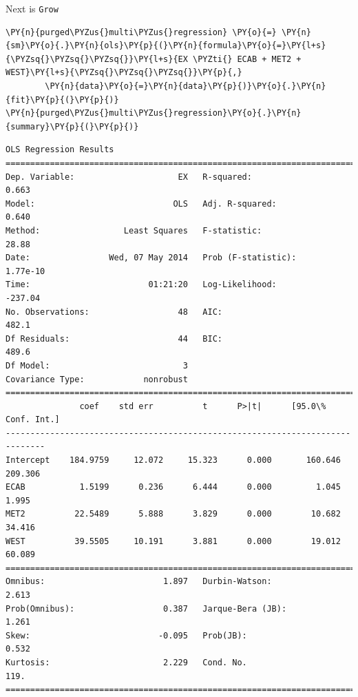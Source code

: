 \documentclass[10pt]{article}\usepackage[]{graphicx}\usepackage[]{xcolor}
\begin{document}
    Next is \texttt{Grow}

    \begin{Verbatim}[commandchars=\\\{\}]
\PY{n}{purged\PYZus{}multi\PYZus{}regression} \PY{o}{=} \PY{n}{sm}\PY{o}{.}\PY{n}{ols}\PY{p}{(}\PY{n}{formula}\PY{o}{=}\PY{l+s}{\PYZsq{}\PYZsq{}\PYZsq{}}\PY{l+s}{EX \PYZti{} ECAB + MET2 + WEST}\PY{l+s}{\PYZsq{}\PYZsq{}\PYZsq{}}\PY{p}{,}
        \PY{n}{data}\PY{o}{=}\PY{n}{data}\PY{p}{)}\PY{o}{.}\PY{n}{fit}\PY{p}{(}\PY{p}{)}
\PY{n}{purged\PYZus{}multi\PYZus{}regression}\PY{o}{.}\PY{n}{summary}\PY{p}{(}\PY{p}{)}
\end{Verbatim}

\begin{Verbatim}[commandchars=\\\{\}]
                          OLS Regression Results                            
==============================================================================
Dep. Variable:                     EX   R-squared:                       0.663
Model:                            OLS   Adj. R-squared:                  0.640
Method:                 Least Squares   F-statistic:                     28.88
Date:                Wed, 07 May 2014   Prob (F-statistic):           1.77e-10
Time:                        01:21:20   Log-Likelihood:                -237.04
No. Observations:                  48   AIC:                             482.1
Df Residuals:                      44   BIC:                             489.6
Df Model:                           3                                         
Covariance Type:            nonrobust                                         
==============================================================================
               coef    std err          t      P>|t|      [95.0\% Conf. Int.]
------------------------------------------------------------------------------
Intercept    184.9759     12.072     15.323      0.000       160.646   209.306
ECAB           1.5199      0.236      6.444      0.000         1.045     1.995
MET2          22.5489      5.888      3.829      0.000        10.682    34.416
WEST          39.5505     10.191      3.881      0.000        19.012    60.089
==============================================================================
Omnibus:                        1.897   Durbin-Watson:                   2.613
Prob(Omnibus):                  0.387   Jarque-Bera (JB):                1.261
Skew:                          -0.095   Prob(JB):                        0.532
Kurtosis:                       2.229   Cond. No.                         119.
==============================================================================
\end{Verbatim}
        
\end{document}
